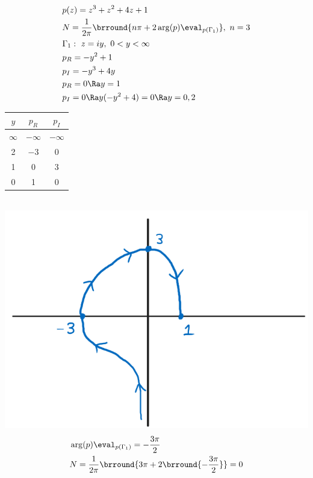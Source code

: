 \begin{align*}
    &p(z)=z^3+z^2+4z+1\\
    &N=\frac{1}{2\pi}\brround{n\pi+2\arg(p)\eval_{p(\Gamma_1)}},\ n=3\\
    &\Gamma_1:\ z=iy,\ 0<y<\infty\\
    &p_R=-y^2+1\\
    &p_I=-y^3+4y\\
    &p_R=0\Ra y=1\\
    &p_I=0\Ra y(-y^2+4)=0\Ra y=0,2
\end{align*}
\begin{tabular}{c|c|c}
    $y$ & $p_R$ & $p_I$\\
    \hline
    $\infty$ & $-\infty$ & $-\infty$\\
    2 & $-3$ & 0\\
    1 & 0 & 3\\
    0 & 1 & 0
\end{tabular}\\
\includegraphics[scale=0.5]{Images/ComplexAnalysisPictures/Q7.png}
\begin{align*}
    &\arg(p)\eval_{p(\Gamma_1)}=-\frac{3\pi}{2}\\
    &N=\frac{1}{2\pi}\brround{3\pi+2\brround{-\frac{3\pi}{2}}}=0
\end{align*}

